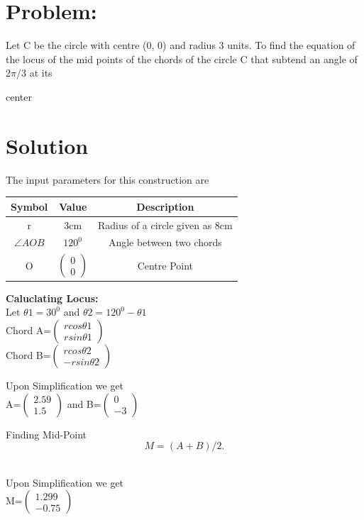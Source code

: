 \documentclass[10pt,a4paper]{report}
\newcommand{\myvec}[1]{\ensuremath{\begin{pmatrix}#1\end{pmatrix}}}
\begin{document}
\begin{multicols}{2}
\section{Problem:}  Let C be the circle with centre (0, 0) and radius 3 units. To find the equation of the locus of the mid points of the chords of the circle C that subtend an angle of 2$\pi$/3 at its \raggedright center\vspace{3mm}
\section{Solution}
The input parameters for this construction are
\begin{center}
\begin{tabular}{|c|c|c|}
  \hline
  \textbf{Symbol}&\textbf{Value}&\textbf{Description}\\
  \hline
  r & 3cm & Radius of a circle given as 8cm\\
  \hline
  $\angle{AOB}$ & $120^0$ & Angle between two chords\\
  \hline 
  O & $\myvec{0\\0}$ & Centre Point\\
  \hline
\end{tabular}
\end{center}
\raggedright\textbf{Caluclating Locus:} \\
 \centering  Let $\theta1=30^0$ and $\theta2=120^0-\theta1 $
 \vspace{5mm}
 \\ Chord A=$\myvec{rcos \theta1 \\ rsin \theta1 }$ \\
 \vspace{5mm}
 Chord B=$\myvec{rcos \theta2 \\ -rsin \theta2 }$ \\
 \raggedright Upon Simplification we get \\ 
   \centering   A=$\myvec{2.59 \\ 1.5}$ and  B=$\myvec{0 \\ -3 }$ \\ 
    \vspace{5mm}
\raggedright Finding Mid-Point
      \begin{equation} M=(A+B)/2. \end{equation} \\
    \raggedright Upon Simplification we get \\ 
       \centering M=$\myvec{1.299\\ -0.75 }$ \\

\end{multicols}
\end{document}
